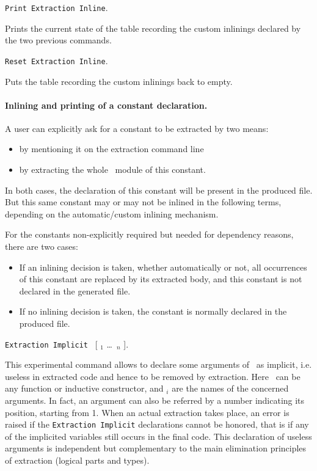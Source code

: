 \begin{description}
\item {}
{\tt Print Extraction Inline}. 

Prints the current state of the table recording the custom inlinings 
declared by the two previous commands. 

\item {}
{\tt Reset Extraction Inline}. 

Puts the table recording the custom inlinings back to empty. 

\end{description}


\paragraph{Inlining and printing of a constant declaration.}

A user can explicitly ask for a constant to be extracted by two means:
\begin{itemize}
\item by mentioning it on the extraction command line
\item by extracting the whole \Coq\ module of this constant.
\end{itemize}
In both cases, the declaration of this constant will be present in the
produced file. 
But this same constant may or may not be inlined in the following
terms, depending on the automatic/custom inlining mechanism.  


For the constants non-explicitly required but needed for dependency
reasons, there are two cases: 
\begin{itemize}
\item If an inlining decision is taken, whether automatically or not,
all occurrences of this constant are replaced by its extracted body, and
this constant is not declared in the generated file.
\item If no inlining decision is taken, the constant is normally
  declared in the produced file. 
\end{itemize}


\begin{description}
\item {}
 {\tt Extraction Implicit} \qualid\ [ \ident$_1$ \dots\ \ident$_n$ ].

This experimental command allows to declare some arguments of
\qualid\ as implicit, i.e. useless in extracted code and hence to
be removed by extraction. Here \qualid\ can be any function or
inductive constructor, and \ident$_i$ are the names of the concerned
arguments. In fact, an argument can also be referred by a number
indicating its position, starting from 1. When an actual extraction
takes place, an error is raised if the {\tt Extraction Implicit}
declarations cannot be honored, that is if any of the implicited
variables still occurs in the final code. This declaration of useless
arguments is independent but complementary to the main elimination
principles of extraction (logical parts and types).
\end{description}

